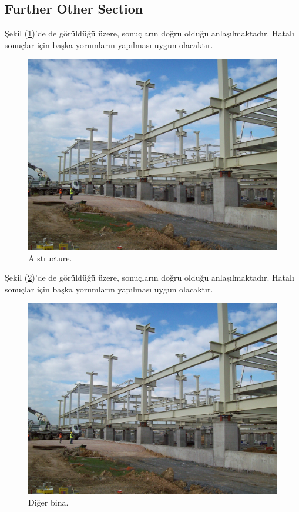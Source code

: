 \documentclass[english]{eqengconf}
\begin{document}
\blindtext

\subsection{Further Other Section}
\blindtext

Şekil (\ref{fig:structure})'de de görüldüğü üzere, sonuçların doğru olduğu anlaşılmaktadır. Hatalı sonuçlar için başka yorumların yapılması uygun olacaktır.


\begin{figure}
	\vspace{-0.2cm}
	\centering
	\includegraphics[scale=0.2]{b.PNG}
	\caption{\label{fig:structure} A structure.}
	\vspace{-10pt}
\end{figure}

\blindtext

\blindtext

Şekil (\ref{fig:otherstruct})'de de görüldüğü üzere, sonuçların doğru olduğu anlaşılmaktadır. Hatalı sonuçlar için başka yorumların yapılması uygun olacaktır.

\begin{figure}[]
	\centering
	\includegraphics[scale=0.4]{b.PNG}
	\caption{\label{fig:otherstruct}Diğer bina.}
\end{figure}
\end{document}
